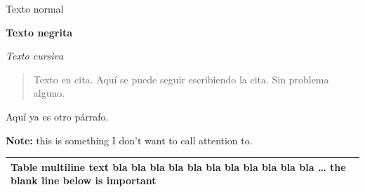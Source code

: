 \documentclass[
]{krantz}
\begin{document}
Texto normal

\textbf{Texto negrita}

\emph{Texto cursiva}

\begin{quote}
Texto en cita.
Aquí se puede seguir escribiendo la cita.
Sin problema alguno.
\end{quote}

Aquí ya es otro párrafo.

\textbf{Note:} this is something I don't want to call attention to.

\begin{longtable}[]{@{}l@{}}
\toprule
\endhead
\begin{minipage}[t]{0.81\columnwidth}\raggedright
Table multiline text bla bla bla bla
bla bla bla bla bla bla bla \ldots{} the
blank line below is important\strut
\end{minipage}\tabularnewline
\bottomrule
\end{longtable}

  
\end{document}

